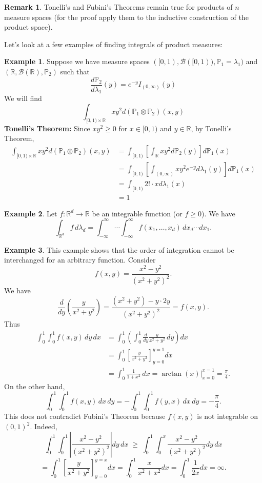 \documentclass[11pt,a4paper]{article}
\theoremstyle{definition}
\newtheorem{example}{Example}[section]
\newtheorem{remark}{Remark}[section]
\begin{document}
\begin{remark}
Tonelli's and Fubini's Theorems remain true for products of $n$ measure spaces
(for the proof apply them to the inductive construction of the product space).
\end{remark}
\noindent Let's look at a few examples of finding integrals of product measures:

\begin{example}
    Suppose we have measure spaces $([0,1), \mathcal{B}([0,1)), \mathbb{P}_1 = \lambda_1)$ and $(\mathbb{R}, \mathcal{B}(\mathbb{R}), \mathbb{P}_2)$ such that \[
    \frac{d\mathbb{P}_2}{d\lambda _1} (y) = e^{-y}I_{(0,\infty)} (y)
    \]
    We will find \[
    \int _{[0,1) \times \mathbb{R}} xy^2 d(\mathbb{P}_1 \otimes \mathbb{P}_2)(x,y)
    \]
    \noindent\textbf{Tonelli's Theorem:} Since $xy^2 \ge 0$ for $x \in [0,1)$ and $y\in \mathbb{R}$, by Tonelli's Theorem,
        \begin{align*}
        \int _{[0,1) \times \mathbb{R}} xy^2 d(\mathbb{P}_1 \otimes \mathbb{P}_2)(x,y) & = \int _{[0,1)} \left [ \int _{\mathbb{R}}xy^2 d\mathbb{P}_2(y) \right ]d\mathbb{P}_1(x) \\ & = \int _{[0,1)} \left [\int_{(0,\infty )} xy^2 e^{-y}d\lambda _1 (y)\right ] d\mathbb{P}_1(x) \\ & = \int _{[0,1)}2! \cdot   xd\lambda_1 (x) \\ & = 1
        \end{align*}
    \end{example}

\begin{example}
Let $f : \mathbb{R}^d \to {\mathbb{R}}$ be an integrable function (or $f \ge 0$). We have
\[
\int_{\mathbb{R}^d} f \, d\lambda_d
    = \int_{-\infty}^{\infty} \!\!\cdots\! \int_{-\infty}^{\infty}
        f(x_1, \ldots, x_d)\, dx_d \cdots dx_1.
\]
\end{example}


\begin{example}
This example shows that the order of integration cannot be interchanged 
for an arbitrary function. Consider
\[
f(x,y) = \frac{x^2 - y^2}{(x^2 + y^2)^2}.
\]
We have
\[
\frac{d}{dy}\left( \frac{y}{x^2 + y^2} \right)
= \frac{(x^2 + y^2) - y \cdot 2y}{(x^2 + y^2)^2} = f(x,y).
\]
Thus
\begin{align*}
\int_0^1 \int_0^1 f(x,y)\, dy\, dx
&= \int_0^1 \left( \int_0^1 \frac{d}{dy}\frac{y}{x^2 + y^2}\, dy \right) dx \\
&= \int_0^1 \left[ \frac{y}{x^2 + y^2} \right]_{y=0}^{y=1} dx \\
&= \int_0^1 \frac{1}{1+x^2}\, dx
= \arctan(x)\Big|_{x=0}^{x=1}
= \frac{\pi}{4}.
\end{align*}
On the other hand,
\[
\int_0^1 \int_0^1 f(x,y)\, dx \, dy
= - \int_0^1 \int_0^1 f(y,x)\, dx \, dy
= -\frac{\pi}{4}.
\]
This does not contradict Fubini's Theorem because $f(x,y)$ is not integrable on
$(0,1)^2$. Indeed,
\[
\int_0^1 \int_0^1 \left| \frac{x^2 - y^2}{(x^2 + y^2)^2} \right| dy \, dx
\;\ge\;
\int_0^1 \int_0^x \frac{x^2 - y^2}{(x^2 + y^2)^2} dy \, dx
\]
\[
= \int_0^1 \left[ \frac{y}{x^2 + y^2} \right]_{y=0}^{y=x} dx
= \int_0^1 \frac{x}{x^2 + x^2} dx
= \int_0^1 \frac{1}{2x} dx
= \infty.
\]
\end{example}
\end{document}
